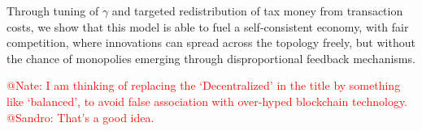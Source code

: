 \documentclass[a4paper,12pt]{article}
\newcommand{\red}[1]{\textcolor{red}{#1}} %
\begin{document}
Through tuning of $\gamma$ and targeted redistribution of tax money from transaction costs, we show that this model is able to fuel a self-consistent economy, 
with fair competition, where innovations can spread across the topology freely, but without the chance of monopolies emerging through disproportional feedback mechanisms. 

\red{
@Nate: I am thinking of replacing the `Decentralized' in the title by something like `balanced', to avoid false association with over-hyped blockchain technology.
@Sandro: That's a good idea.
}
\end{document}
